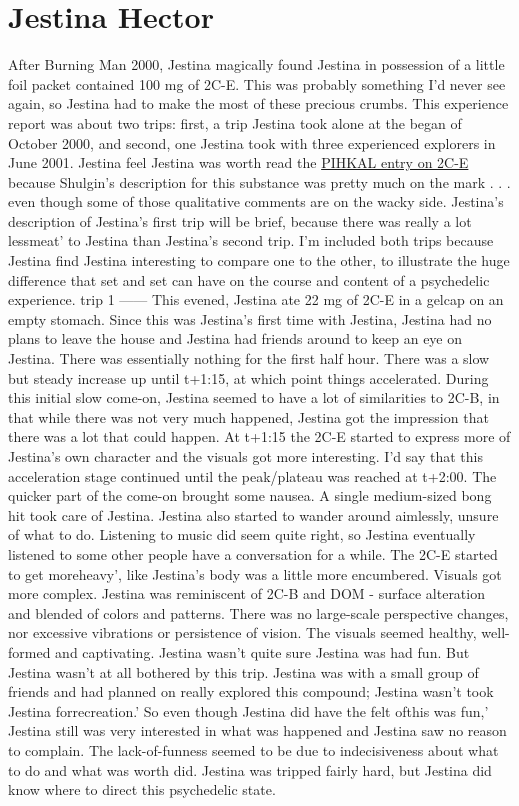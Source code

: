 \documentclass[12pt]{book}
\begin{document}
\chapter{Jestina Hector}

After Burning Man 2000, Jestina magically found Jestina in possession of a little foil packet contained 100 mg of 2C-E. This was probably something I'd never see again, so Jestina had to make the most of these precious crumbs. This experience report was about two trips: first, a trip Jestina took alone at the began of October 2000, and second, one Jestina took with three experienced explorers in June 2001. Jestina feel Jestina was worth read the \href{http://www.government.org/library/books\_online/pihkal/pihkal024.shtml}{ PIHKAL entry on 2C-E} because Shulgin's description for this substance was pretty much on the mark . . .  even though some of those qualitative comments are on the wacky side. Jestina's description of Jestina's first trip will be brief, because there was really a lot lessmeat' to Jestina than Jestina's second trip. I'm included both trips because Jestina find Jestina interesting to compare one to the other, to illustrate the huge difference that set and set can have on the course and content of a psychedelic experience. trip 1 ------ This evened, Jestina ate 22 mg of 2C-E in a gelcap on an empty stomach. Since this was Jestina's first time with Jestina, Jestina had no plans to leave the house and Jestina had friends around to keep an eye on Jestina. There was essentially nothing for the first half hour. There was a slow but steady increase up until t+1:15, at which point things accelerated. During this initial slow come-on, Jestina seemed to have a lot of similarities to 2C-B, in that while there was not very much happened, Jestina got the impression that there was a lot that could happen. At t+1:15 the 2C-E started to express more of Jestina's own character and the visuals got more interesting. I'd say that this acceleration stage continued until the peak/plateau was reached at t+2:00. The quicker part of the come-on brought some nausea. A single medium-sized bong hit took care of Jestina. Jestina also started to wander around aimlessly, unsure of what to do. Listening to music did seem quite right, so Jestina eventually listened to some other people have a conversation for a while. The 2C-E started to get moreheavy', like Jestina's body was a little more encumbered. Visuals got more complex. Jestina was reminiscent of 2C-B and DOM - surface alteration and blended of colors and patterns. There was no large-scale perspective changes, nor excessive vibrations or persistence of vision. The visuals seemed healthy, well-formed and captivating. Jestina wasn't quite sure Jestina was had fun. But Jestina wasn't at all bothered by this trip. Jestina was with a small group of friends and had planned on really explored this compound; Jestina wasn't took Jestina forrecreation.' So even though Jestina did have the felt ofthis was fun,' Jestina still was very interested in what was happened and Jestina saw no reason to complain. The lack-of-funness seemed to be due to indecisiveness about what to do and what was worth did. Jestina was tripped fairly hard, but Jestina did know where to direct this psychedelic state. 
\end{document}
